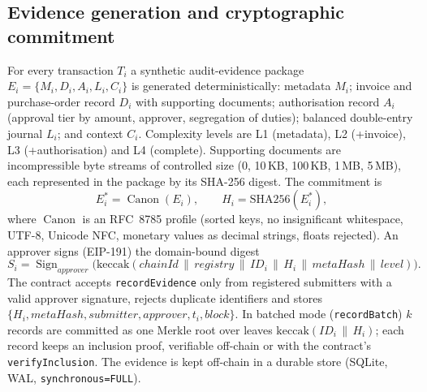 \documentclass[10pt]{article}
\begin{document}
\subsection{Evidence generation and cryptographic commitment}
For every transaction $T_i$ a synthetic audit-evidence package $E_i=\{M_i,D_i,A_i,L_i,C_i\}$ is generated
deterministically: metadata $M_i$; invoice and purchase-order record $D_i$ with supporting documents; authorisation
record $A_i$ (approval tier by amount, approver, segregation of duties); balanced double-entry journal $L_i$; and
context $C_i$. Complexity levels are L1 (metadata), L2 (+invoice), L3 (+authorisation) and L4 (complete).
Supporting documents are incompressible byte streams of controlled size (0, 10\,KB, 100\,KB, 1\,MB, 5\,MB), each
represented in the package by its SHA-256 digest. The commitment is
\begin{equation}
E_i^{*}=\operatorname{Canon}(E_i),\qquad H_i=\mathrm{SHA256}(E_i^{*}),
\end{equation}
where $\operatorname{Canon}$ is an RFC~8785 profile (sorted keys, no insignificant whitespace, UTF-8, Unicode NFC,
monetary values as decimal strings, floats rejected). An approver signs (EIP-191) the domain-bound digest
\begin{equation}
S_i=\operatorname{Sign}_{\mathit{approver}}\bigl(\mathrm{keccak}(\mathit{chainId}\,\|\,\mathit{registry}\,\|\,ID_i\,\|\,H_i\,\|\,\mathit{metaHash}\,\|\,\mathit{level})\bigr).
\end{equation}
The contract accepts \texttt{recordEvidence} only from registered submitters with a valid approver signature, rejects
duplicate identifiers and stores $\{H_i,\mathit{metaHash},\mathit{submitter},\mathit{approver},t_i,\mathit{block}\}$.
In batched mode (\texttt{recordBatch}) $k$ records are committed as one Merkle root over leaves
$\mathrm{keccak}(ID_i\,\|\,H_i)$; each record keeps an inclusion proof, verifiable off-chain or with the
contract's \texttt{verifyInclusion}. The evidence is kept off-chain in a durable store (SQLite, WAL,
\texttt{synchronous=FULL}).
\end{document}
